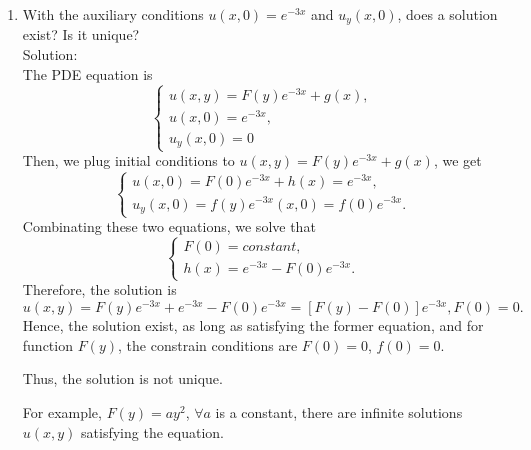 \documentclass[12pt]{article}%
\begin{document}
\begin{enumerate}
\begin{enumerate}
\begin{enumerate}
            \item With the auxiliary conditions $u\left(x,0\right) = e^{-3x}$ and $u_y\left(x,0\right)$, does a solution exist? Is it unique? \smallskip \\
            Solution:\\
            The PDE equation is 
            \begin{equation*}
                \begin{cases}
                    u(x,y)=F(y)e^{-3x}+g(x),
                    \\
                    u(x,0)=e^{-3x},
                    \\
                    u_{y}(x,0)=0
                \end{cases}
            \end{equation*}
            Then, we plug initial conditions to $u(x,y)=F(y)e^{-3x}+g(x)$, we get
            \begin{equation*}
                \begin{cases}
                    u(x,0)=F(0)e^{-3x}+h(x)=e^{-3x},
                    \\
                    u_{y}(x,0)=f(y)e^{-3x}(x,0)=f(0)e^{-3x}.
                \end{cases}
            \end{equation*}
            Combinating these two equations, we solve that
            \begin{equation*}
                \begin{cases}
                    F(0)=constant,
                    \\
                    h(x)=e^{-3x}-F(0)e^{-3x}.
                \end{cases}
            \end{equation*}
            Therefore, the solution is 
           \[u(x,y)=F(y)e^{-3x}+e^{-3x}-F(0)e^{-3x}=[F(y)-F(0)]e^{-3x}, F(0)=0.\]
           Hence, the solution exist, as long as satisfying the former equation, and for function $F(y)$, the constrain conditions are $F(0)=0$, $f(0)=0$.
           
           Thus, the solution is not unique. 
           
           For example, $F(y)=ay^2$, $\forall a $ is a constant, there are infinite solutions $u(x,y)$ satisfying the equation.

            
        \end{enumerate}
    \end{enumerate}


\end{enumerate}
\end{document}
